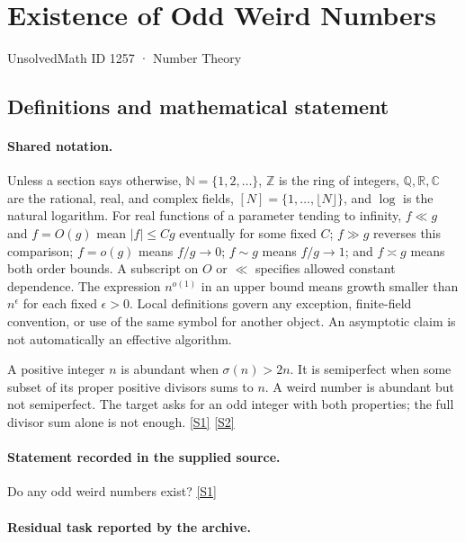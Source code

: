 \documentclass[11pt,a4paper]{article}
\newcommand{\N}{\mathbb{N}}
\newcommand{\Z}{\mathbb{Z}}
\newcommand{\Q}{\mathbb{Q}}
\newcommand{\R}{\mathbb{R}}
\newcommand{\C}{\mathbb{C}}
\newcommand{\sref}[2]{\hyperlink{source:#1:#2}{[S#2]}}
\begin{document}

\setcounter{section}{1256}

\section{Existence of Odd Weird Numbers}\label{1257}

{\small\sffamily UnsolvedMath ID 1257 · Number Theory}

\subsection{Definitions and mathematical statement}

\paragraph{Shared notation.}Unless a section says otherwise, $\N=\{1,2,\ldots\}$,
$\Z$ is the ring of integers, $\Q,\R,\C$ are the rational, real, and complex
fields, $[N]=\{1,\ldots,\lfloor N\rfloor\}$, and $\log$ is the natural
logarithm. For real functions of a parameter tending to infinity,
$f\ll g$ and $f=O(g)$ mean $|f|\leq Cg$ eventually for some fixed $C$;
$f\gg g$ reverses this comparison; $f=o(g)$ means $f/g\to0$;
$f\sim g$ means $f/g\to1$; and $f\asymp g$ means both order bounds.
A subscript on $O$ or $\ll$ specifies allowed constant dependence.
The expression $n^{o(1)}$ in an upper bound means growth smaller than
$n^\epsilon$ for each fixed $\epsilon>0$. Local definitions govern any
exception, finite-field convention, or use of the same symbol for another
object. An asymptotic claim is not automatically an effective algorithm.



A positive integer $n$ is abundant when $\sigma(n)>2n$. It is semiperfect when some subset of its proper positive divisors sums to $n$. A weird number is abundant but not semiperfect. The target asks for an odd integer with both properties; the full divisor sum alone is not enough. \sref{1257}{1} \sref{1257}{2}

\paragraph{Statement recorded in the supplied source.}
Do any odd weird numbers exist? \sref{1257}{1}

\paragraph{Residual task reported by the archive.}
\end{document}
